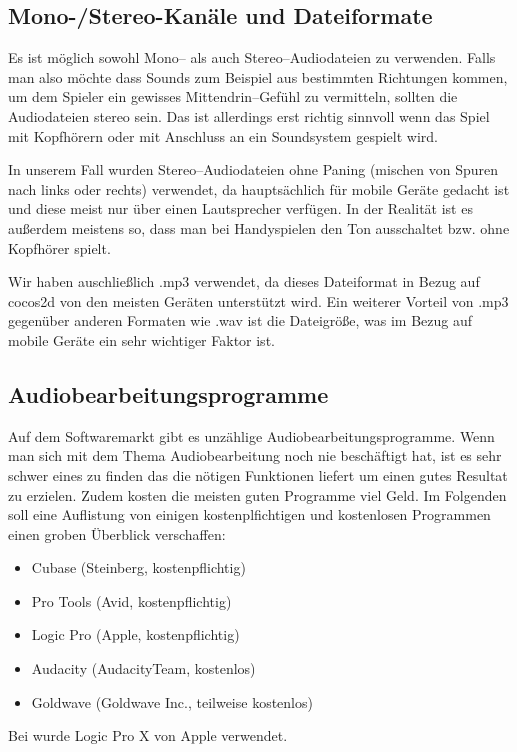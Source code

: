 \subsection{Mono-/Stereo-Kanäle und Dateiformate}
Es ist möglich sowohl Mono-- als auch Stereo--Audiodateien zu verwenden. Falls man also möchte dass Sounds zum Beispiel aus bestimmten Richtungen kommen, um dem Spieler ein gewisses Mittendrin--Gefühl zu vermitteln, sollten die Audiodateien stereo sein. Das ist allerdings erst richtig sinnvoll wenn das Spiel mit Kopfhörern oder mit Anschluss an ein Soundsystem gespielt wird. 

In unserem Fall wurden Stereo--Audiodateien ohne Paning (mischen von Spuren nach links oder rechts) verwendet, da \gamename hauptsächlich für mobile Geräte gedacht ist und diese meist nur über einen Lautsprecher verfügen. In der Realität ist es außerdem meistens so, dass man bei Handyspielen den Ton ausschaltet bzw. ohne Kopfhörer spielt.

Wir haben auschließlich .mp3 verwendet, da dieses Dateiformat in Bezug auf cocos2d von den meisten Geräten unterstützt wird. Ein weiterer Vorteil von .mp3 gegenüber anderen Formaten wie .wav ist die Dateigröße, was im Bezug auf mobile Geräte ein sehr wichtiger Faktor ist.


\subsection{Audiobearbeitungsprogramme}
Auf dem Softwaremarkt gibt es unzählige Audiobearbeitungsprogramme. Wenn man sich mit dem Thema Audiobearbeitung noch nie beschäftigt hat, ist es sehr schwer eines zu finden das die nötigen Funktionen liefert um einen gutes Resultat zu erzielen. Zudem kosten die meisten guten Programme viel Geld. Im Folgenden soll eine Auflistung von einigen kostenplfichtigen und kostenlosen Programmen einen groben Überblick verschaffen:

\begin{itemize}
 \item Cubase (Steinberg, kostenpflichtig)
 \item Pro Tools (Avid, kostenpflichtig)
 \item Logic Pro (Apple, kostenpflichtig)
 \item Audacity (AudacityTeam, kostenlos)
 \item Goldwave (Goldwave Inc., teilweise kostenlos)
 \end{itemize} 

Bei \gamename wurde Logic Pro X von Apple verwendet. 
